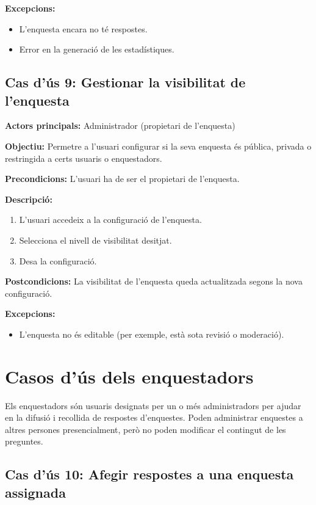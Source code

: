 \documentclass[../main.tex]{subfiles}
\begin{document}
\textbf{Excepcions:}
\begin{itemize}
    \item L’enquesta encara no té respostes.
    \item Error en la generació de les estadístiques.
\end{itemize}

\subsection*{Cas d’ús 9: Gestionar la visibilitat de l’enquesta}

\textbf{Actors principals:} Administrador (propietari de l’enquesta)

\textbf{Objectiu:} Permetre a l’usuari configurar si la seva enquesta és pública, privada o restringida a certs usuaris o enquestadors.

\textbf{Precondicions:}  
L’usuari ha de ser el propietari de l’enquesta.

\textbf{Descripció:}
\begin{enumerate}
    \item L’usuari accedeix a la configuració de l’enquesta.
    \item Selecciona el nivell de visibilitat desitjat.
    \item Desa la configuració.
\end{enumerate}

\textbf{Postcondicions:}  
La visibilitat de l’enquesta queda actualitzada segons la nova configuració.

\textbf{Excepcions:}
\begin{itemize}
    \item L’enquesta no és editable (per exemple, està sota revisió o moderació).
\end{itemize}

\section{Casos d’ús dels enquestadors}

Els enquestadors són usuaris designats per un o més administradors per ajudar en la difusió i recollida de respostes d’enquestes.
Poden administrar enquestes a altres persones presencialment, però no poden modificar el contingut de les preguntes.

\subsection*{Cas d’ús 10: Afegir respostes a una enquesta assignada}
\end{document}
